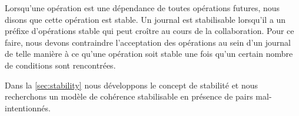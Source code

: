 Lorsqu'une opération est une dépendance de toutes opérations futures, nous disons que cette opération est stable.
Un journal est stabilisable lorsqu'il a un préfixe d'opérations stable qui peut croître au cours de la collaboration.
Pour ce faire, nous devons contraindre l'acceptation des opérations au sein d'un journal de telle manière à ce qu'une opération soit stable une fois qu'un certain nombre de conditions sont rencontrées.

Dans la \autoref{sec:stability} nous développons le concept de stabilité et nous recherchons un modèle de cohérence stabilisable en présence de pairs mal-intentionnés.

%
%
%
%
